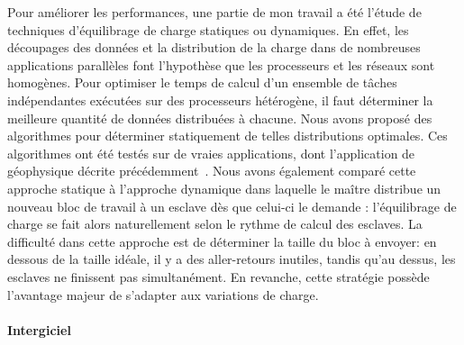 Pour améliorer  les performances,  une partie  de mon travail  a été  l'étude de
techniques  d'équilibrage de  charge  statiques ou  dynamiques.   En effet,  les
découpages  des données  et  la distribution  de la  charge  dans de  nombreuses
applications parallèles font l'hypothèse que les processeurs et les réseaux sont
homogènes.  Pour  optimiser   le  temps  de  calcul  d'un   ensemble  de  tâches
indépendantes exécutées  sur des processeurs  hétérogène, il faut  déterminer la
meilleure  quantité de  données distribuées  à chacune.  Nous avons  proposé des
algorithmes pour déterminer statiquement  de telles distributions optimales. Ces
algorithmes ont  été testés  sur de vraies  applications, dont  l'application de
géophysique décrite précédemment~\cite{icps-2002-62,icps-2003-75,icps-2004-125}.
Nous avons également comparé cette approche statique à l'approche dynamique dans
laquelle le  maître distribue un  nouveau bloc de travail  à un esclave  dès que
celui-ci le demande : l'équilibrage de  charge se fait alors naturellement selon
le  rythme de  calcul des  esclaves. La  difficulté dans  cette approche  est de
déterminer la taille du  bloc à envoyer: en dessous de la taille  idéale, il y a
des aller-retours inutiles,  tandis qu'au dessus, les esclaves  ne finissent pas
simultanément.  En  revanche,  cette  stratégie  possède  l'avantage  majeur  de
s'adapter aux variations de charge.


\paragraph{Intergiciel}

